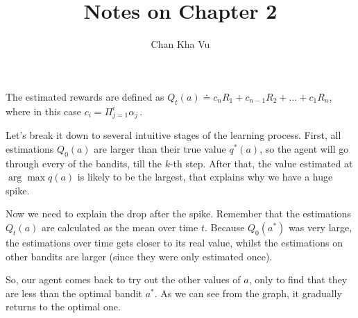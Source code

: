 \documentclass[a4paper]{article}
\title{Notes on Chapter 2}
\author{Chan Kha Vu}
\date{}
\begin{document}
\maketitle

\begin{exercise}[2.4]
  The estimated rewards are defined as $Q_t(a) \doteq c_n R_1 + c_{n-1} R_2 + \ldots + c_1 R_n$,
  where in this case $c_i = \Pi_{j=1}^i \alpha_j\,.$
\end{exercise}

\begin{exercise}[2.6]
  \noindent

  Let's break it down to several intuitive stages of the learning process.
  First, all estimations $Q_0(a)$ are larger than their true value $q^*(a)$,
  so the agent will go through every of the bandits, till the $k$-th step.
  After that, the value estimated at $\arg\max q(a)$ is likely to be the
  largest, that explains why we have a huge spike.

  Now we need to explain the drop after the spike. Remember that the estimations
  $Q_t(a)$ are calculated as the mean over time $t$. Because $Q_0(a^*)$ was very
  large, the estimations over time gets closer to its real value, whilst the
  estimations on other bandits are larger (since they were only estimated once).

  So, our agent comes back to try out the other values of $a$, only to find that
  they are less than the optimal bandit $a^*$. As we can see from the graph, it
  gradually returns to the optimal one.
\end{exercise}
\end{document}
